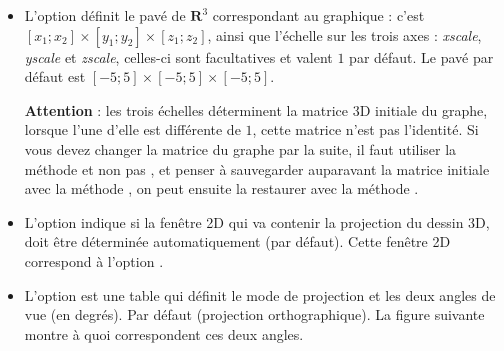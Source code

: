 \begin{itemize}
 \item L'option  définit le pavé de $\mathbf R^3$ correspondant au graphique : c'est $[x_1;x_2]\times[y_1;y_2]\times[z_1;z_2]$, ainsi que l'échelle sur les trois axes : \emph{xscale}, \emph{yscale} et \emph{zscale}, celles-ci  sont facultatives et valent $1$ par défaut. Le pavé par défaut est $[-5;5]\times[-5;5]\times[-5;5]$.
 
 \textbf{Attention} : les trois échelles déterminent la matrice 3D initiale du graphe, lorsque l'une d'elle est différente de $1$, cette matrice n'est pas l'identité. Si vous devez changer la matrice du graphe par la suite, il faut utiliser la méthode  et non pas , et penser à sauvegarder auparavant la matrice initiale avec la méthode , on peut ensuite la restaurer avec la méthode .
 
 \item L'option  indique si la fenêtre 2D qui va contenir la projection du dessin 3D, doit être déterminée automatiquement (\false par défaut). Cette fenêtre 2D correspond à l'option .
 
 \item L'option  est une table qui définit le mode de projection et les deux angles de vue (en degrés). Par défaut  (projection orthographique). La figure suivante montre à quoi correspondent ces deux angles.
 

\end{itemize}
